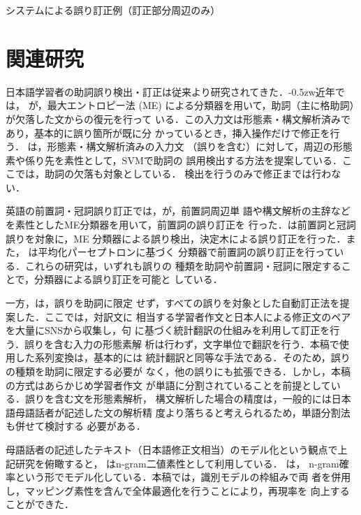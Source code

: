 \documentclass[japanese]{jnlp_1.4}
\begin{document}
\begin{table}[t]
\caption{システムによる誤り訂正例（訂正部分周辺のみ）}
\label{tbl-correct-examples}

\end{table}



\section{関連研究}
\label{sec-related-work}

日本語学習者の助詞誤り検出・訂正は従来より研究されてきた．{\kern-0.5zw}近年では，
が，最大エントロピー法 (ME) 
による分類器を用いて，助詞（主に格助詞）が欠落した文からの復元を行って
いる．この入力文は形態素・構文解析済みであり，基本的に誤り箇所が既に分
かっているとき，挿入操作だけで修正を行う．
は，形態素・構文解析済みの入力文
（誤りを含む）に対して，周辺の形態素や係り先を素性として，SVMで助詞の
誤用検出する方法を提案している．ここでは，助詞の欠落も対象としている．
検出を行うのみで修正までは行わない．

英語の前置詞・冠詞誤り訂正では，が，前置詞周辺単
語や構文解析の主辞などを素性としたME分類器を用いて，前置詞の誤り訂正を
行った．は前置詞と冠詞誤りを対象に，ME
分類器による誤り検出，決定木による誤り訂正を行った．また，
は平均化パーセプトロンに基づく
分類器で前置詞の誤り訂正を行っている．これらの研究は，いずれも誤りの
種類を助詞や前置詞・冠詞に限定することで，分類器による誤り訂正を可能と
している．

一方，は，誤りを助詞に限定
せず，すべての誤りを対象とした自動訂正法を提案した．ここでは，対訳文に
相当する学習者作文と日本人による修正文のペアを大量にSNSから収集し，句
に基づく統計翻訳の仕組みを利用して訂正を行う．誤りを含む入力の形態素解
析は行わず，文字単位で翻訳を行う．本稿で使用した系列変換は，基本的には
統計翻訳と同等な手法である．そのため，誤りの種類を助詞に限定する必要が
なく，他の誤りにも拡張できる．しかし，本稿の方式はあらかじめ学習者作文
が単語に分割されていることを前提としている．誤りを含む文を形態素解析，
構文解析した場合の精度は，一般的には日本語母語話者が記述した文の解析精
度より落ちると考えられるため，単語分割法も併せて検討する
必要がある．

母語話者の記述したテキスト（日本語修正文相当）のモデル化という観点で上
記研究を俯瞰すると，
はn-gram二値素性として利用している．
は，
n-gram確率という形でモデル化している．本稿では，識別モデルの枠組みで両
者を併用し，マッピング素性を含んで全体最適化を行うことにより，再現率を
向上することができた．
\end{document}
